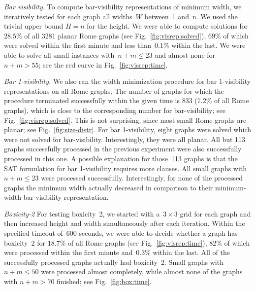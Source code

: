 \documentclass[runningheads]{llncs}
\begin{document}
\smallskip\noindent\textit{Bar visibility.}
To compute bar-visibility representations of minimum width,
we iteratively tested for each graph all widths~$W$
between~1 and~n. We used the trivial upper bound $H=n$ for the height.
We were able to compute solutions
for~$28.5\%$ of all 3281 planar Rome graphs (see
Fig.~\ref{fig:visrep:solved}), $69\%$ of which were solved within the
first minute and less than~$0.1\%$ within the last.
We were able to solve all small instances with~$n+m \leq 23$
and almost none for~$n+m >55$; see the red curve in
Fig.~\ref{fig:visrep:time}.
\par


\smallskip\noindent\textit{Bar 1-visibility.} We also ran the width minimization procedure for 
bar 1-visibility representations on all Rome graphs. 
The number of graphs for which the procedure terminated successfully
within the given time is 833 ($7.2\%$ of all Rome graphs),
which is close to the corresponding number for bar-visibility; see
Fig.~\ref{fig:visrep:solved}. 
 This is not surprising, since most small Rome graphs are planar;
 see Fig.~\ref{fig:size-distr}. 
For bar 1-visibility, eight graphs were solved 
which were not solved for bar-visibility.
Interestingly, they were all planar.
All but 113 graphs successfully processed in the previous
experiment 
were also successfully processed in this one. 
A possible explanation for those~113 graphs is that the SAT formulation for
 bar 1-visibility requires more clauses.
All small graphs with $n+m \leq 23$ were processed successfully.
Interestingly, for none of the processed graphs
the minimum width actually decreased in comparison to their
minimum-width bar-visibility representation.


\smallskip\noindent\textit{Boxicity-2}
For testing boxicity~2,
we started with a~$3\times 3$ grid for each graph 
and then increased height and width simultaneously after each iteration.
Within the specified timeout of~600 seconds,
we were able to decide whether a graph has boxicity~2
for $18.7\%$ of all Rome graphs (see Fig.~\ref{fig:visrep:time}),
$82\%$ of which were processed within the first minute and~$0.3\%$
within the last.
All of the successfully processed graphs actually had boxicity~2.
Small graphs with $n+m \leq 50$ were processed almost completely,
while almost none of the graphs with $n+m> 70$ finished;
see Fig.~\ref{fig:box:time}. 
\end{document}
